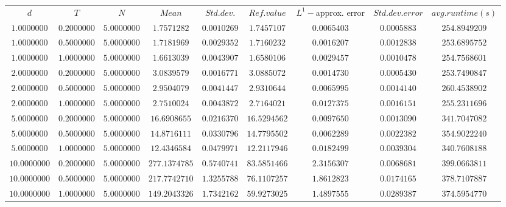 \begin{tabular}{ccccccccc}
$d$ & $T$ & $N$ & $Mean$ & $Std. dev.$ & $Ref. value$ & $L^1-$approx. error & $Std. dev. error$ & $avg. runtime (s)$\\
$1.0000000$ & $0.2000000$ & $5.0000000$ & $1.7571282$ & $0.0010269$ & $1.7457107$ & $0.0065403$ & $0.0005883$ & $254.8949209$\\
$1.0000000$ & $0.5000000$ & $5.0000000$ & $1.7181969$ & $0.0029352$ & $1.7160232$ & $0.0016207$ & $0.0012838$ & $253.6895752$\\
$1.0000000$ & $1.0000000$ & $5.0000000$ & $1.6613039$ & $0.0043907$ & $1.6580106$ & $0.0029457$ & $0.0010478$ & $254.7568601$\\
$2.0000000$ & $0.2000000$ & $5.0000000$ & $3.0839579$ & $0.0016771$ & $3.0885072$ & $0.0014730$ & $0.0005430$ & $253.7490847$\\
$2.0000000$ & $0.5000000$ & $5.0000000$ & $2.9504079$ & $0.0041447$ & $2.9310644$ & $0.0065995$ & $0.0014140$ & $260.4538902$\\
$2.0000000$ & $1.0000000$ & $5.0000000$ & $2.7510024$ & $0.0043872$ & $2.7164021$ & $0.0127375$ & $0.0016151$ & $255.2311696$\\
$5.0000000$ & $0.2000000$ & $5.0000000$ & $16.6908655$ & $0.0216370$ & $16.5294562$ & $0.0097650$ & $0.0013090$ & $341.7047082$\\
$5.0000000$ & $0.5000000$ & $5.0000000$ & $14.8716111$ & $0.0330796$ & $14.7795502$ & $0.0062289$ & $0.0022382$ & $354.9022240$\\
$5.0000000$ & $1.0000000$ & $5.0000000$ & $12.4346584$ & $0.0479971$ & $12.2117946$ & $0.0182499$ & $0.0039304$ & $340.7608188$\\
$10.0000000$ & $0.2000000$ & $5.0000000$ & $277.1374785$ & $0.5740741$ & $83.5851466$ & $2.3156307$ & $0.0068681$ & $399.0663811$\\
$10.0000000$ & $0.5000000$ & $5.0000000$ & $217.7742710$ & $1.3255788$ & $76.1107257$ & $1.8612823$ & $0.0174165$ & $378.7107887$\\
$10.0000000$ & $1.0000000$ & $5.0000000$ & $149.2043326$ & $1.7342162$ & $59.9273025$ & $1.4897555$ & $0.0289387$ & $374.5954770$\\
\end{tabular}
